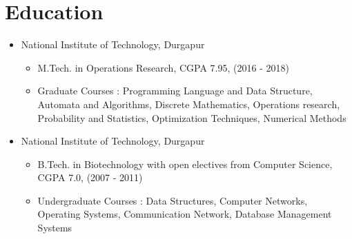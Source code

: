 \documentclass[a4paper,10pt]{article}
\begin{document}
	\section{Education}
	\begin{itemize}
		\item National Institute of Technology, Durgapur
		\begin{itemize}
			\item M.Tech. in Operations Research,  CGPA 7.95, (2016 - 2018)
		\item Graduate Courses : Programming Language and Data Structure, Automata and Algorithms, Discrete Mathematics, Operations research,  Probability and Statistics, Optimization Techniques, Numerical Methods
		\end{itemize}
		
		\item National Institute of Technology, Durgapur
		\begin{itemize}
			\item B.Tech. in Biotechnology with open electives from Computer Science,  CGPA 7.0, (2007 - 2011)
		\item Undergraduate Courses : Data Structures, Computer Networks, Operating Systems, Communication Network, Database Management Systems
		\end{itemize}
	\end{itemize}
	
\end{document}
